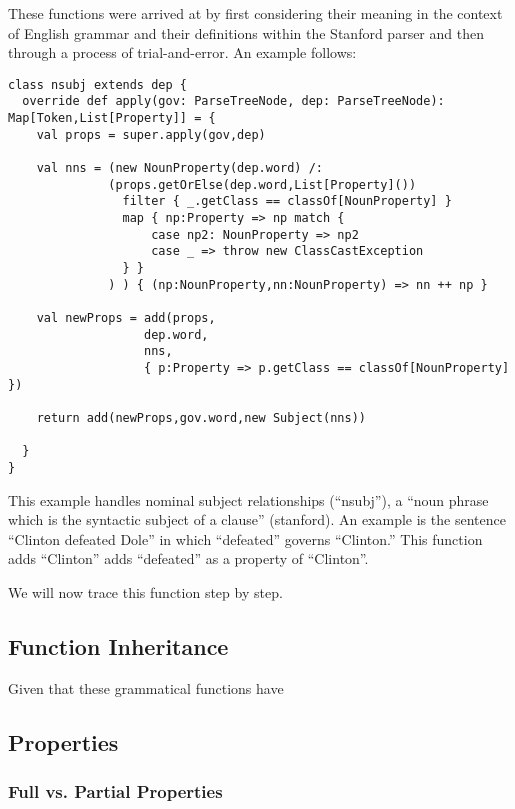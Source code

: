 \documentclass[11pt]{article}
\begin{document}
These functions were arrived at by first considering their meaning in the context of English grammar and their definitions within the Stanford parser and then through a process of trial-and-error.  An example follows: 

\begin{lstlisting}
class nsubj extends dep	{
  override def apply(gov: ParseTreeNode, dep: ParseTreeNode): Map[Token,List[Property]] = {
    val props = super.apply(gov,dep)

    val nns = (new NounProperty(dep.word) /: 
              (props.getOrElse(dep.word,List[Property]()) 
                filter { _.getClass == classOf[NounProperty] } 
                map { np:Property => np match { 
                    case np2: NounProperty => np2 
                    case _ => throw new ClassCastException 
                } } 
              ) ) { (np:NounProperty,nn:NounProperty) => nn ++ np }

    val newProps = add(props,
                   dep.word,
                   nns,
                   { p:Property => p.getClass == classOf[NounProperty] })
                   
    return add(newProps,gov.word,new Subject(nns))

  }
}
\end{lstlisting}

This example handles nominal subject relationships (``nsubj''), a ``noun phrase which is the syntactic subject of a clause'' (stanford).  An example is the sentence ``Clinton defeated Dole'' in which ``defeated'' governs ``Clinton.''  This function adds ``Clinton'' adds ``defeated'' as a property of ``Clinton''.  

We will now trace this function step by step.

\subsection{Function Inheritance}

Given that these grammatical functions have 

\subsection{Properties}
\label{algo:properties}

\subsubsection{Full vs. Partial Properties}
\end{document}
